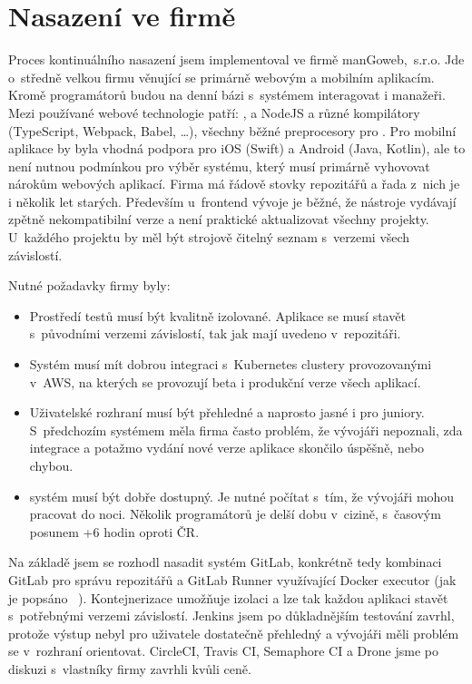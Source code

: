 \chapter{Nasazení ve firmě}
    Proces kontinuálního nasazení jsem implementoval ve firmě manGoweb,~s.r.o. Jde o~středně velkou firmu věnující se primárně webovým a mobilním aplikacím. Kromě programátorů budou na denní bázi s~\CI systémem interagovat i manažeři. Mezi používané webové technologie patří: ,  a NodeJS a různé kompilátory (TypeScript, Webpack, Babel, …), všechny běžné preprocesory pro . Pro mobilní aplikace by byla vhodná podpora pro iOS (Swift) a Android (Java, Kotlin), ale to není nutnou podmínkou pro výběr \CICD systému, který musí primárně vyhovovat nárokům webových aplikací. Firma má řádově stovky repozitářů a řada z~nich je i několik let starých. Především u~frontend vývoje je běžné, že nástroje vydávají zpětně nekompatibilní verze a není praktické aktualizovat všechny projekty. U~každého projektu by měl být strojově čitelný seznam s~verzemi všech závislostí.

    Nutné požadavky firmy byly:
    \begin{itemize}
        \item Prostředí testů musí být kvalitně izolované. Aplikace se musí stavět s~původními verzemi závislostí, tak jak mají uvedeno v~repozitáři.
        \item Systém musí mít dobrou integraci s~Kubernetes clustery provozovanými v~AWS, na kterých se provozují beta i produkční verze všech aplikací.
        \item Uživatelské rozhraní musí být přehledné a naprosto jasné i pro juniory. S~předchozím systémem měla firma často problém, že vývojáři nepoznali, zda integrace a potažmo vydání nové verze aplikace skončilo úspěšně, nebo chybou.
        \item \CICD systém musí být dobře dostupný. Je nutné počítat s~tím, že vývojáři mohou pracovat do noci. Několik programátorů je delší dobu v~cizině, s~časovým posunem +6 hodin oproti ČR\@.
    \end{itemize}

    Na základě  jsem se rozhodl nasadit \CICD systém GitLab, konkrétně tedy kombinaci GitLab pro správu repozitářů a GitLab Runner využívající Docker executor (jak je popsáno ~). Kontejnerizace umožňuje izolaci a lze tak každou aplikaci stavět s~potřebnými verzemi závislostí. Jenkins jsem po důkladnějším testování zavrhl, protože výstup nebyl pro uživatele dostatečně přehledný a vývojáři měli problém se v~rozhraní orientovat. CircleCI, Travis CI, Semaphore CI a Drone jsme po diskuzi s~vlastníky firmy zavrhli kvůli ceně.

